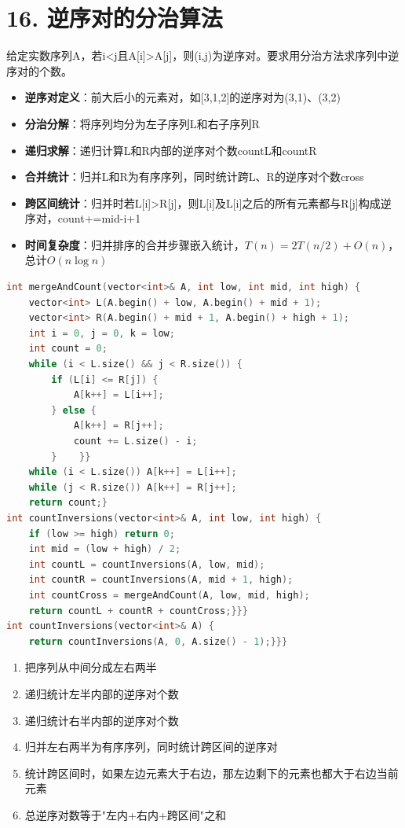 \section*{16. 逆序对的分治算法}

给定实数序列A，若i<j且A[i]>A[j]，则(i,j)为逆序对。要求用分治方法求序列中逆序对的个数。

\begin{itemize}
    \item \textbf{逆序对定义}：前大后小的元素对，如[3,1,2]的逆序对为(3,1)、(3,2)
    \item \textbf{分治分解}：将序列均分为左子序列L和右子序列R
    \item \textbf{递归求解}：递归计算L和R内部的逆序对个数countL和countR
    \item \textbf{合并统计}：归并L和R为有序序列，同时统计跨L、R的逆序对个数cross
    \item \textbf{跨区间统计}：归并时若L[i]>R[j]，则L[i]及L[i]之后的所有元素都与R[j]构成逆序对，count+=mid-i+1
    \item \textbf{时间复杂度}：归并排序的合并步骤嵌入统计，$T(n)=2T(n/2)+O(n)$，总计$O(n\log n)$
\end{itemize}

\begin{lstlisting}[language=C++, style=cppstyle]
int mergeAndCount(vector<int>& A, int low, int mid, int high) {
    vector<int> L(A.begin() + low, A.begin() + mid + 1);
    vector<int> R(A.begin() + mid + 1, A.begin() + high + 1);
    int i = 0, j = 0, k = low;
    int count = 0;
    while (i < L.size() && j < R.size()) {
        if (L[i] <= R[j]) {
            A[k++] = L[i++];
        } else {
            A[k++] = R[j++];
            count += L.size() - i;
        }    }}
    while (i < L.size()) A[k++] = L[i++];
    while (j < R.size()) A[k++] = R[j++];
    return count;}
int countInversions(vector<int>& A, int low, int high) {
    if (low >= high) return 0;
    int mid = (low + high) / 2;
    int countL = countInversions(A, low, mid);
    int countR = countInversions(A, mid + 1, high);
    int countCross = mergeAndCount(A, low, mid, high);
    return countL + countR + countCross;}}}
int countInversions(vector<int>& A) {
    return countInversions(A, 0, A.size() - 1);}}}
\end{lstlisting}

\begin{enumerate}
    \item 把序列从中间分成左右两半
    \item 递归统计左半内部的逆序对个数
    \item 递归统计右半内部的逆序对个数
    \item 归并左右两半为有序序列，同时统计跨区间的逆序对
    \item 统计跨区间时，如果左边元素大于右边，那左边剩下的元素也都大于右边当前元素
    \item 总逆序对数等于"左内+右内+跨区间"之和
\end{enumerate}
